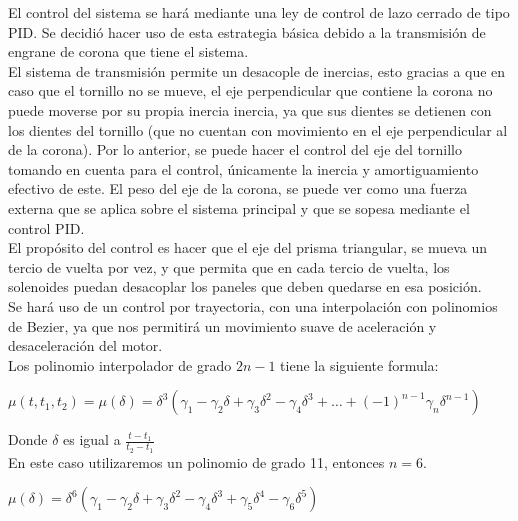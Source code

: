 El control del sistema se hará mediante una ley de control de lazo cerrado de tipo PID. Se decidió hacer uso de esta estrategia básica debido a la transmisión de engrane de corona que tiene el sistema. \\
El sistema de transmisión permite un desacople de inercias, esto gracias a que en caso que el tornillo no se mueve, el eje perpendicular que contiene la corona no puede moverse por su propia inercia inercia, ya que sus dientes se detienen con los dientes del tornillo (que no cuentan con movimiento en el eje perpendicular al de la corona). Por lo anterior, se puede hacer el control del eje del tornillo tomando en cuenta para el control, únicamente la inercia y amortiguamiento efectivo de este. El peso del eje de la corona, se puede ver como una fuerza externa que se aplica sobre el sistema principal y que se sopesa mediante el control PID. \\
El propósito del control es hacer que el eje del prisma triangular, se mueva un tercio de vuelta por vez, y que permita que en cada tercio de vuelta, los solenoides puedan desacoplar los paneles que deben quedarse en esa posición. \\
Se hará uso de un control por trayectoria, con una interpolación con polinomios de Bezier, ya que nos permitirá un movimiento suave de aceleración y desaceleración del motor. \\
Los polinomio interpolador de grado $2n-1$ tiene la siguiente formula:

$\mu(t, t_1, t_2) = \mu(\delta) = \delta^{3}\left(\gamma_1 - \gamma_2\delta + \gamma_3\delta^{2} - \gamma_4\delta^{3} + \dots + \left(-1 \right)^{n-1}\gamma_n\delta^{n-1}  \right)$

Donde $\delta$ es igual a $\frac{t - t_1}{t_2 - t_1}$ \\
En este caso utilizaremos un polinomio de grado 11, entonces $n = 6$.

$\mu(\delta) = \delta^{6}\left(\gamma_1 - \gamma_2\delta + \gamma_3\delta^{2} - \gamma_4\delta^{3}+ \gamma_5\delta^{4} - \gamma_6\delta^{5} \right)$

